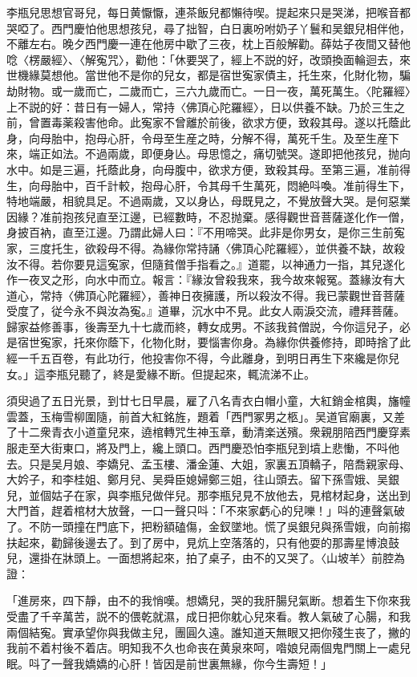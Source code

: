 李瓶兒思想官哥兒，每日黄懨懨，連茶飯兒都懶待喫。提起來只是哭涕，把喉音都哭啞了。西門慶怕他思想孩兒，尋了拙智，白日裏吩咐奶子丫鬟和吴銀兒相伴他，不離左右。晚夕西門慶一連在他房中歇了三夜，枕上百般解勸。薛姑子夜間又替他唸〈楞嚴經〉、〈解寃咒〉，勸他：「休要哭了，經上不説的好，改頭換面輪迴去，來世機緣莫想他。當世他不是你的兒女，都是宿世寃家債主，托生來，化財化物，騙劫財物。或一歲而亡，二歲而亡，三六九歲而亡。一日一夜，萬死萬生。〈陀羅經〉上不説的好：昔日有一婦人，常持〈佛頂心陀羅經〉，日以供養不缺。乃於三生之前，曾置毒薬殺害他命。此寃家不曾離於前後，欲求方便，致殺其母。遂以托蔭此身，向母胎中，抱母心肝，令母至生産之時，分解不得，萬死千生。及至生産下來，端正如法。不過兩歲，即便身亾。母思憶之，痛切號哭。遂即把他孩兒，抛向水中。如是三遍，托蔭此身，向母腹中，欲求方便，致殺其母。至第三遍，准前得生，向母胎中，百千計較，抱母心肝，令其母千生萬死，悶絶呌喚。准前得生下，特地端嚴，相貌具足。不過兩歲，又以身亾，母既見之，不覺放聲大哭。是何惡業因緣？准前抱孩兒直至江邊，已經數時，不忍抛棄。感得觀世音菩薩遂化作一僧，身披百衲，直至江邊。乃謂此婦人曰：『不用啼哭。此非是你男女，是你三生前寃家，三度托生，欲殺母不得。為緣你常持誦〈佛頂心陀羅經〉，並供養不缺，故殺汝不得。若你要見這寃家，但隨貧僧手指看之。』道罷，以神通力一指，其兒遂化作一夜叉之形，向水中而立。報言：『緣汝曾殺我來，我今故來報冤。蓋緣汝有大道心，常持〈佛頂心陀羅經〉，善神日夜擁護，所以殺汝不得。我已蒙觀世音菩薩受度了，従今永不與汝為寃。』道畢，沉水中不見。此女人兩淚交流，禮拜菩薩。歸家益修善事，後壽至九十七歲而終，轉女成男。不該我貧僧説，今你這兒子，必是宿世寃家，托來你蔭下，化物化財，要惱害你身。為緣你供養修持，即時捨了此經一千五百卷，有此功行，他投害你不得，今此離身，到明日再生下來纔是你兒女。」這李瓶兒聽了，終是愛緣不断。但提起來，輒流涕不止。

須臾過了五日光景，到廿七日早晨，雇了八名青衣白帽小童，大紅銷金棺輿，旛幢雲蓋，玉梅雪柳圍隨，前首大紅銘旌，題着「西門冢男之柩」。吴道官廟裏，又差了十二衆青衣小道童兒來，遶棺轉咒生神玉章，動清楽送殯。衆親朋陪西門慶穿素服走至大街東口，將及門上，纔上頭口。西門慶恐怕李瓶兒到墳上悲慟，不呌他去。只是吴月娘、李嬌兒、孟玉樓、潘金蓮、大姐，家裏五頂轎子，陪喬親家母、大妗子，和李桂姐、鄭月兒、吴舜臣媳婦鄭三姐，往山頭去。留下孫雪娥、吴銀兒，並個姑子在家，與李瓶兒做伴兒。那李瓶兒見不放他去，見棺材起身，送出到大門首，趕着棺材大放聲，一口一聲只呌：「不來家虧心的兒嚛！」呌的連聲氣破了。不防一頭撞在門底下，把粉額磕傷，金釵墜地。慌了吳銀兒與孫雪娥，向前搊扶起來，勸歸後邊去了。到了房中，見炕上空落落的，只有他耍的那壽星博浪鼓兒，還掛在牀頭上。一面想將起來，拍了桌子，由不的又哭了。〈山坡羊〉前腔為證：

\begin{myquote}
「進房來，四下靜，由不的我悄嘆。想嬌兒，哭的我肝腸兒氣断。想着生下你來我受盡了千辛萬苦，説不的偎乾就濕，成日把你躭心兒來看。教人氣破了心腸，和我兩個結寃。實承望你與我做主兒，團圓久遠。誰知道天無眼又把你殘生丧了，撇的我前不着村後不着店。明知我不久也命丧在黄泉來呵，喒娘兒兩個鬼門關上一處兒眠。呌了一聲我嬌嬌的心肝！皆因是前世裏無緣，你今生壽短！」
\end{myquote}

